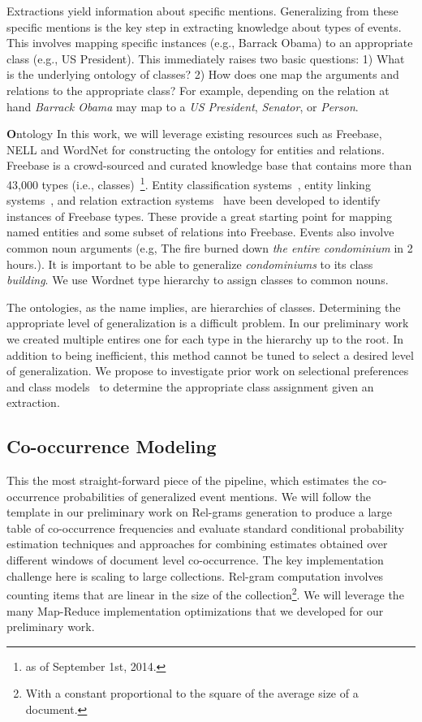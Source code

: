 Extractions yield information about specific mentions. Generalizing from these specific mentions is the key step in extracting knowledge about types of events. This involves mapping specific instances (e.g., Barrack Obama) to an appropriate class (e.g., US President). This immediately raises two basic questions: 1) What is the underlying ontology of classes? 2) How does one map the arguments and relations to the appropriate class? For example, depending on the relation at hand {\em Barrack Obama} may map to a {\em US President}, {\em Senator}, or {\em Person}.  

{\textbf Ontology} In this work, we will leverage existing resources such as Freebase, NELL and WordNet for constructing the ontology for entities and relations. Freebase is a crowd-sourced and curated knowledge base that contains more than 43,000 types (i.e., classes)~\footnote{as of September 1st, 2014.}. Entity classification systems~\cite{xiao}, entity linking systems~\cite{tlin}, and relation extraction systems~\cite{multir} have been developed to identify instances of Freebase types. These provide a great starting 
point for mapping named entities and some subset of relations into Freebase. Events also involve common noun arguments (e.g, The fire burned down {\em the entire condominium} in 2 hours.). It is important to be able to generalize {\em condominiums} to its class {\em building}. We use Wordnet type hierarchy to assign classes to common nouns.

The ontologies, as the name implies, are hierarchies of classes. Determining the appropriate level of generalization is a difficult problem. In our preliminary work we created multiple entires one for each type in the hierarchy up to the root. In addition to being inefficient, this method cannot be tuned to select a desired level of generalization. We propose to investigate prior work on selectional preferences and class models~\cite{} to determine the appropriate class assignment given an extraction.
 
\subsection{Co-occurrence Modeling}

This the most straight-forward piece of the pipeline, which estimates the co-occurrence probabilities of generalized event mentions. We will follow the template in our preliminary work on Rel-grams generation to produce a large table of co-occurrence frequencies and evaluate standard conditional probability estimation techniques and approaches for combining estimates obtained over different windows of document level co-occurrence. The key implementation challenge here is scaling to large collections. Rel-gram computation involves counting items that are linear in the size of the collection\footnote{With a constant proportional to the square of the average size of a document.}. We will leverage the many Map-Reduce implementation optimizations that we developed for our preliminary work.
 
